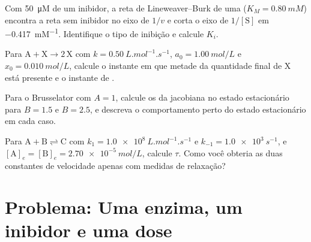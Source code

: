 \begin{exercise}[$\star\star$]\label{exo:b3:complex-kinetics:9}
Com \qty{50}{\micro M} de um inibidor, a reta de Lineweaver--Burk de uma 
($K_M = \qty{0.80}{mM}$) encontra a reta sem inibidor no eixo de $1/v$ e corta o eixo de
$1/[\mathrm S]$ em \qty{-0.417}{mM^{-1}}. Identifique o tipo de inibição e calcule $K_i$.
\end{exercise}

\begin{exercise}[$\star\star\star$]\label{exo:b3:complex-kinetics:10}
Para $\mathrm{A + X \to 2\,X}$ com $k = \qty{0.50}{L.mol^{-1}.s^{-1}}$, $a_0 = \qty{1.00}{mol/L}$ e $x_0 = \qty{0.010}{mol/L}$,
calcule o instante em que metade da quantidade final de X está presente e o
instante de .
\end{exercise}

\begin{exercise}[$\star\star\star$]\label{exo:b3:complex-kinetics:11}
Para o Brusselator com $A = 1$, calcule os  da jacobiana no estado
estacionário para $B = 1.5$ e $B = 2.5$, e descreva o comportamento perto do
estado estacionário em cada caso.
\end{exercise}

\begin{exercise}[$\star\star\star$]\label{exo:b3:complex-kinetics:12}
Para $\mathrm{A + B \rightleftharpoons C}$ com $k_1 = \qty{1.0e8}{L.mol^{-1}.s^{-1}}$ e $k_{-1} = \qty{1.0e3}{s^{-1}}$, e
$[\mathrm A]_e = [\mathrm B]_e = \qty{2.70e-5}{mol/L}$, calcule $\tau$. Como você obteria as duas constantes de
velocidade apenas com medidas de relaxação?
\end{exercise}

\section{Problema: Uma enzima, um inibidor e uma dose}

